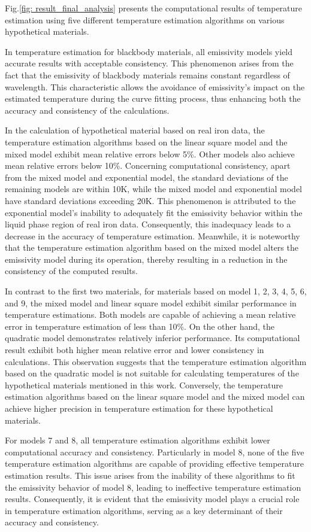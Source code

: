Fig.\ref{fig: result_final_analysis} presents the computational results of 
temperature estimation using five different temperature estimation algorithms 
on various hypothetical materials. 


In temperature estimation for blackbody materials, all emissivity models yield accurate 
results with acceptable consistency. This phenomenon arises from the fact that 
the emissivity of blackbody materials remains constant regardless of wavelength.
This characteristic allows the avoidance of emissivity's impact on the estimated 
temperature during the curve fitting process, thus enhancing both the accuracy 
and consistency of the calculations.


In the calculation of hypothetical material based on real iron data, 
the temperature estimation algorithms based on the linear square model and the 
mixed model exhibit mean relative errors below 5\%. Other models also achieve 
mean relative errors below 10\%. Concerning computational consistency, 
apart from the mixed model and exponential model, the standard deviations of the 
remaining models are within 10K, while the mixed model and exponential model have 
standard deviations exceeding 20K. This phenomenon is attributed to the exponential 
model's inability to adequately 
fit the emissivity behavior within the liquid phase region of real iron data. 
Consequently, this inadequacy leads to a decrease in the accuracy of temperature 
estimation. Meanwhile, it is noteworthy that the temperature estimation algorithm 
based on the mixed model alters the emissivity model during its operation, thereby 
resulting in a reduction in the consistency of the computed results.


In contrast to the first two materials, for materials based on model 1, 2, 3, 4, 5, 
6, and 9, the mixed model and linear square model exhibit similar performance 
in temperature estimations. Both models are capable of achieving a mean relative 
error in temperature estimation of less than 10\%. On the other hand, the quadratic 
model demonstrates relatively inferior performance. Its computational result 
exhibit both higher mean relative error and lower consistency in calculations. 
This observation suggests that the temperature estimation algorithm based on the 
quadratic model is not suitable for calculating temperatures of the hypothetical 
materials mentioned in this work. Conversely, the temperature estimation algorithms 
based on the linear square model and the mixed model can achieve higher precision 
in temperature estimation for these hypothetical materials.


For models 7 and 8, all temperature estimation algorithms exhibit lower 
computational accuracy and consistency. Particularly in model 8, 
none of the five temperature estimation algorithms are capable of providing 
effective temperature estimation results. This issue arises from the inability 
of these algorithms to fit the emissivity behavior of model 8, leading to 
ineffective temperature estimation results. Consequently, it is evident that the 
emissivity model plays a crucial role in temperature estimation algorithms, 
serving as a key determinant of their accuracy and consistency.